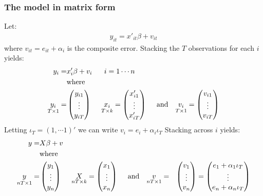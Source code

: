 \documentclass[a4paper,twoside,11pt]{article}
\begin{document}
\subsubsection{The model in matrix form}
Let: 
\begin{equation*}
\begin{aligned}
y_{it} = x'_{it} \beta + v_{it}
\end{aligned} 
\end{equation*}
where $v_{it} = e_{it} + \alpha_i$ is the composite error. 
\newline
\newline
Stacking the $T$ observations for each $i$ yields:
\begin{equation*}
\begin{aligned}
y_{i} =& x'_{i} \beta + v_{i} \ \ \ \ \ i=1\cdots n \\
& \textmd{where} \\
\underset{T \times 1}{y_i} =& \begin{pmatrix}
y_{i1} \\
\vdots \\
y_{iT}
\end{pmatrix} \ \ \ \ 
\underset{T \times k}{x_i} = \begin{pmatrix}
x_{i1}' \\
\vdots \\
x_{iT}'
\end{pmatrix} \ \ \ \ \textmd{and} \ \ \  \underset{T \times 1}{v_i} = \begin{pmatrix}
v_{i1} \\
\vdots\\
v_{iT}
\end{pmatrix}
\end{aligned} 
\end{equation*}
Letting $\iota_T = (1,\cdots 1)'$ we can write $v_i = e_i + \alpha_i \iota_T$
\newline
\newline
Stacking across $i$ yields:
\begin{equation*}
\begin{aligned}
y =& X \beta + v  \\
& \textmd{where} \\
\underset{nT \times 1}{y} =& \begin{pmatrix}
y_{1} \\
\vdots \\
y_{n}
\end{pmatrix} \ \ \ \ 
\underset{nT \times k}{X} = \begin{pmatrix}
x_{1} \\
\vdots \\
x_{n}
\end{pmatrix} \ \ \ \ \textmd{and} \ \ \  \underset{nT \times 1}{v} =& \begin{pmatrix}
v_{1} \\
\vdots\\
v_{n}
\end{pmatrix} = \begin{pmatrix}
e_1 + \alpha_1 \iota_T \\
\vdots \\
e_n + \alpha_n \iota_T
\end{pmatrix}
\end{aligned} 
\end{equation*}
\end{document}
